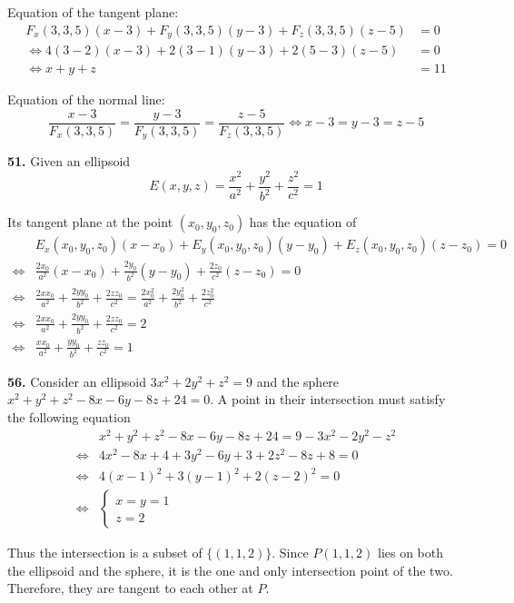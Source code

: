 \documentclass[a4paper,12pt]{article}
\newcommand{\exercise}[1]{\noindent\textbf{#1.}}
\begin{document}
Equation of the tangent plane:
\begin{align*}
     F_x(3, 3, 5)(x - 3) + F_y(3, 3, 5)(y - 3) + F_z(3, 3, 5)(z - 5) &= 0\\
\iff 4(3 - 2)(x - 3) + 2(3 - 1)(y - 3) + 2(5 - 3)(z - 5) &= 0\\
\iff x + y + z &= 11
\end{align*}

Equation of the normal line:
\[\frac{x - 3}{F_x(3, 3, 5)} = \frac{y - 3}{F_y(3, 3, 5)}
                             = \frac{z - 5}{F_z(3, 3, 5)}
\iff x - 3 = y - 3 = z - 5\]

\exercise{51} Given an ellipsoid
\[E(x, y, z) = \frac{x^2}{a^2} + \frac{y^2}{b^2} + \frac{z^2}{c^2} = 1\]

Its tangent plane at the point $(x_0, y_0, z_0)$ has the equation of
\begin{align*}
 &E_x(x_0, y_0, z_0)(x - x_0) + E_y(x_0, y_0, z_0)(y - y_0)
+ E_z(x_0, y_0, z_0)(z - z_0) = 0\\
\iff &\frac{2x_0}{a^2}(x - x_0) + \frac{2y_0}{b^2}(y - y_0)
    + \frac{2z_0}{c^2}(z - z_0) = 0\\
\iff &\frac{2xx_0}{a^2} + \frac{2yy_0}{b^2} + \frac{2zz_0}{c^2}
    = \frac{2x_0^2}{a^2} + \frac{2y_0^2}{b^2} + \frac{2z_0^2}{c^2}\\
\iff &\frac{2xx_0}{a^2} + \frac{2yy_0}{b^2} + \frac{2zz_0}{c^2} = 2\\
\iff &\frac{xx_0}{a^2} + \frac{yy_0}{b^2} + \frac{zz_0}{c^2} = 1
\end{align*}

\exercise{56} Consider an ellipsoid $3x^2 + 2y^2 + z^2 = 9$ and the sphere
$x^2 + y^2 + z^2 - 8x - 6y - 8z + 24 = 0$. A point in their intersection must
satisfy the following equation
\begin{align*}
     &x^2 + y^2 + z^2 - 8x - 6y - 8z + 24 = 9 - 3x^2 - 2y^2 - z^2\\
\iff &4x^2 - 8x + 4 + 3y^2 - 6y + 3 + 2z^2 - 8z + 8 = 0\\
\iff &4(x - 1)^2 + 3(y - 1)^2 + 2(z - 2)^2 = 0\\
\iff &\begin{cases}x = y = 1\\z = 2\end{cases}
\end{align*}

Thus the intersection is a subset of $\{(1, 1, 2)\}$. Since $P(1, 1, 2)$ lies
on both the ellipsoid and the sphere, it is the one and only intersection point
of the two. Therefore, they are tangent to each other at $P$.
\end{document}
